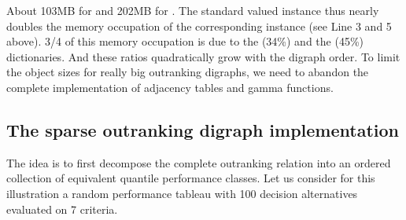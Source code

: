 \documentclass[a4paper,12pt,english]{sphinxhowto}
\begin{document}
\begin{sphinxVerbatim}[commandchars=\\\{\},numbers=left,firstnumber=1,stepnumber=1]
   
\end{sphinxVerbatim}

About 103MB for  and 202MB for . The standard  valued  instance  thus nearly doubles the memory occupation of the corresponding   instance (see Line 3 and 5 above). 3/4 of this memory occupation is due to the  (34\%) and the  (45\%) dictionaries. And these ratios quadratically grow with the digraph order. To limit the object sizes for really big outranking digraphs, we need to abandon the complete implementation of adjacency tables and gamma functions.


\subsection{The sparse outranking digraph implementation}
\label{\detokenize{tutorial:the-sparse-outranking-digraph-implementation}}
The idea is to first decompose the complete outranking relation into an ordered collection of equivalent quantile performance classes. Let us consider for this illustration a random performance tableau with 100 decision alternatives evaluated on 7 criteria.

\begin{sphinxVerbatim}[commandchars=\\\{\},numbers=left,firstnumber=1,stepnumber=1]
   
  
\end{sphinxVerbatim}
\end{document}
